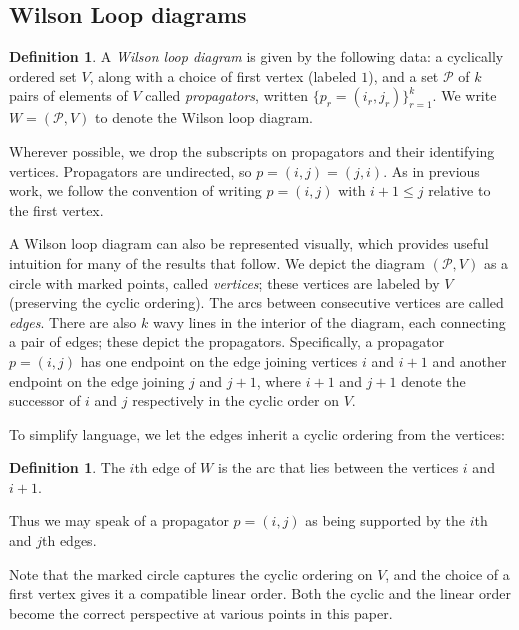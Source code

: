 \documentclass[11pt]{article}
\newcommand{\cP}{\mathcal{P}}
\theoremstyle{remark}
\theoremstyle{definition}
\newtheorem{dfn}[thm]{Definition}
\begin{document}
\subsection{Wilson Loop diagrams}\label{section WLD background} 


\begin{dfn}\label{WLdfn}
A {\em Wilson loop diagram} is given by the following data: a cyclically ordered set $V$, along with a choice of first vertex (labeled $1$), and a set $\cP$ of $k$ pairs of elements of $V$ called {\em propagators}, written $\{p_r = (i_r, j_r)\}_{r=1}^k$. We write $W = (\cP,V)$ to denote the Wilson loop diagram. \end{dfn}

Wherever possible, we drop the subscripts on propagators and their identifying vertices. Propagators are undirected, so $p = (i,j) = (j,i)$. As in previous work, we follow the convention of writing $p = (i,j)$ with  $i +1 \leq j$ relative to the first vertex. 

A Wilson loop diagram can also be represented visually, which provides useful intuition for many of the results that follow. We depict the diagram $(\cP,V)$ as a circle with marked points, called {\em vertices}; these vertices are labeled by $V$ (preserving the cyclic ordering). The arcs between consecutive vertices are called {\em edges}. There are also $k$ wavy lines in the interior of the diagram, each connecting a pair of edges; these depict the propagators. Specifically, a propagator $p =(i,j)$ has one endpoint on the edge joining vertices $i$ and $i+1$ and another endpoint on the edge joining $j$ and $j+1$, where $i+1$ and $j+1$ denote the successor of $i$ and $j$ respectively in the cyclic order on $V$. 

To simplify language, we let the edges inherit a cyclic ordering from the vertices:

\begin{dfn}\label{def:edges}
The $i$th edge of $W$ is the arc that lies between the vertices $i$ and $i+1$.
\end{dfn}

Thus we may speak of a propagator $p = (i, j)$ as being supported by the $i$th and $j$th edges.

Note that the marked circle captures the cyclic ordering on $V$, and the choice of a first vertex gives it a compatible linear order. Both the cyclic and the linear order become the correct perspective at various points in this paper. 
\end{document}
